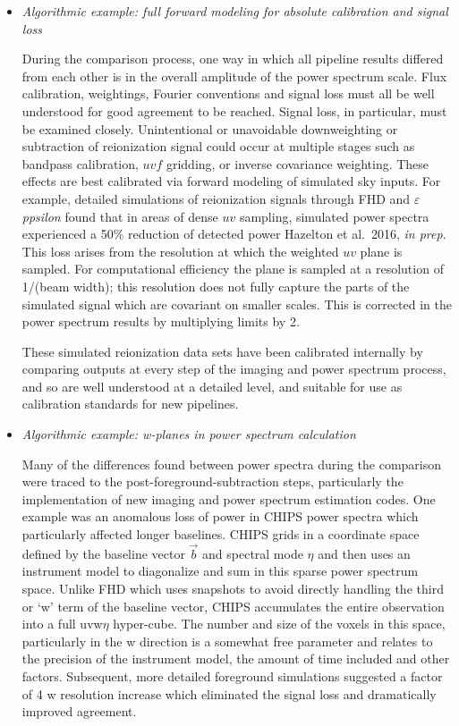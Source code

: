 \documentclass[twolcolumn,iop]{emulateapj}
\def\eppsilon{{\it $\varepsilon$ppsilon}}
\def\eppsiloncite{Hazelton et al.\ 2016, \emph{in prep}}
\begin{document}
\begin{itemize}
\item \emph{Algorithmic example: full forward modeling for absolute calibration and signal loss}

During the comparison process, one way in which all pipeline results differed from each other is in the overall amplitude of the power spectrum scale. Flux calibration, weightings, Fourier conventions and signal loss must all be well understood for good agreement to be reached.  Signal loss, in particular, must be examined closely. Unintentional or unavoidable downweighting or subtraction of reionization signal could occur at multiple stages such as bandpass calibration, $uvf$ gridding, or inverse covariance weighting. These effects are best calibrated via forward modeling of simulated sky inputs.  For example, detailed simulations of reionization signals through FHD and \eppsilon{} found that in areas of dense $uv$ sampling, simulated power spectra experienced a 50\% reduction of detected power \eppsiloncite{}. This loss arises from the resolution at which the weighted $uv$ plane is sampled. For computational efficiency the plane is sampled at a resolution of 1/(beam width); this resolution does not fully capture the parts of the simulated signal which are covariant on smaller scales.    This is corrected in the power spectrum results by multiplying limits by 2.

These simulated reionization data sets have been calibrated internally by comparing outputs at every step of the imaging and power spectrum process, and so are well understood at a detailed level, and suitable for use as calibration standards for new pipelines.



\item \emph{Algorithmic example: w-planes in power spectrum calculation}


Many of the differences found between power spectra during the comparison were traced to the post-foreground-subtraction steps, particularly the implementation of new imaging and power spectrum estimation codes.  One example was an anomalous loss of power in CHIPS power spectra which particularly affected longer baselines.  CHIPS grids in a coordinate space defined by the baseline vector $\vec{b}$ and spectral mode $\eta$ and then uses an instrument model to diagonalize and sum in this sparse power spectrum space.  Unlike FHD which uses snapshots to avoid directly handling the third or `w' term of the baseline vector, CHIPS accumulates the entire observation into a full uvw$\eta$ hyper-cube.  The number and size of the voxels in this space, particularly in the w direction is a somewhat free parameter and relates to the precision of the instrument model, the amount of time included and other factors.  Subsequent, more detailed foreground simulations suggested a factor of 4 w resolution increase which eliminated the signal loss and dramatically improved agreement.



\end{itemize}
\end{document}
